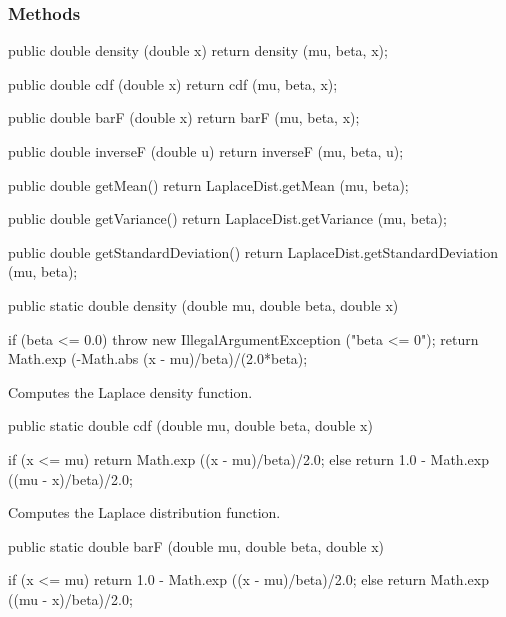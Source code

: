 \subsubsection* {Methods}
\begin{code}\begin{hide}

   public double density (double x) {
      return density (mu, beta, x);
   }

   public double cdf (double x) {
      return cdf (mu, beta, x);
   }

   public double barF (double x) {
      return barF (mu, beta, x);
   }

   public double inverseF (double u) {
      return inverseF (mu, beta, u);
   }

   public double getMean() {
      return LaplaceDist.getMean (mu, beta);
   }

   public double getVariance() {
      return LaplaceDist.getVariance (mu, beta);
   }

   public double getStandardDeviation() {
      return LaplaceDist.getStandardDeviation (mu, beta);
   }\end{hide}

   public static double density (double mu, double beta, double x)\begin{hide} {
      if (beta <= 0.0)
         throw new IllegalArgumentException ("beta <= 0");
      return Math.exp (-Math.abs (x - mu)/beta)/(2.0*beta);
   }\end{hide}
\end{code}
\begin{tabb}
   Computes the Laplace density function.
\end{tabb}
\begin{code}

   public static double cdf (double mu, double beta, double x)\begin{hide} {
      if (x <= mu)
         return Math.exp ((x - mu)/beta)/2.0;
      else
         return 1.0 - Math.exp ((mu - x)/beta)/2.0;
   }\end{hide}
\end{code}
 \begin{tabb}
   Computes the Laplace distribution function.
 \end{tabb}
\begin{code}

   public static double barF (double mu, double beta, double x)\begin{hide} {
      if (x <= mu)
         return 1.0 - Math.exp ((x - mu)/beta)/2.0;
      else
         return Math.exp ((mu - x)/beta)/2.0;
   }\end{hide}
\end{code}
